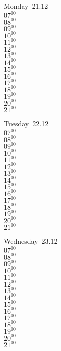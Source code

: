 \documentclass[11pt,a4paper]{book}\usepackage[]{graphicx}\usepackage[]{color}
\begin{document}
\begin{headerbox}
\end{headerbox}
\begin{weekdaybox}
  Monday~21.12\\
  { 
  \vfill
  $07^{00}$\\
$08^{00}$\\
$09^{00}$\\
$10^{00}$\\
$11^{00}$\\
$12^{00}$\\
$13^{00}$\\
$14^{00}$\\
$15^{00}$\\
$16^{00}$\\
$17^{00}$\\
$18^{00}$\\
$19^{00}$\\
$20^{00}$\\
$21^{00}$\\
  }
\end{weekdaybox}
\begin{weekdaybox}
  Tuesday~22.12\\
  { 
  \vfill
  $07^{00}$\\
$08^{00}$\\
$09^{00}$\\
$10^{00}$\\
$11^{00}$\\
$12^{00}$\\
$13^{00}$\\
$14^{00}$\\
$15^{00}$\\
$16^{00}$\\
$17^{00}$\\
$18^{00}$\\
$19^{00}$\\
$20^{00}$\\
$21^{00}$\\
  }
\end{weekdaybox}
\begin{weekdaybox}
  Wednesday~23.12\\
  { 
  \vfill
  $07^{00}$\\
$08^{00}$\\
$09^{00}$\\
$10^{00}$\\
$11^{00}$\\
$12^{00}$\\
$13^{00}$\\
$14^{00}$\\
$15^{00}$\\
$16^{00}$\\
$17^{00}$\\
$18^{00}$\\
$19^{00}$\\
$20^{00}$\\
$21^{00}$\\
  }
\end{weekdaybox}
\end{document}
